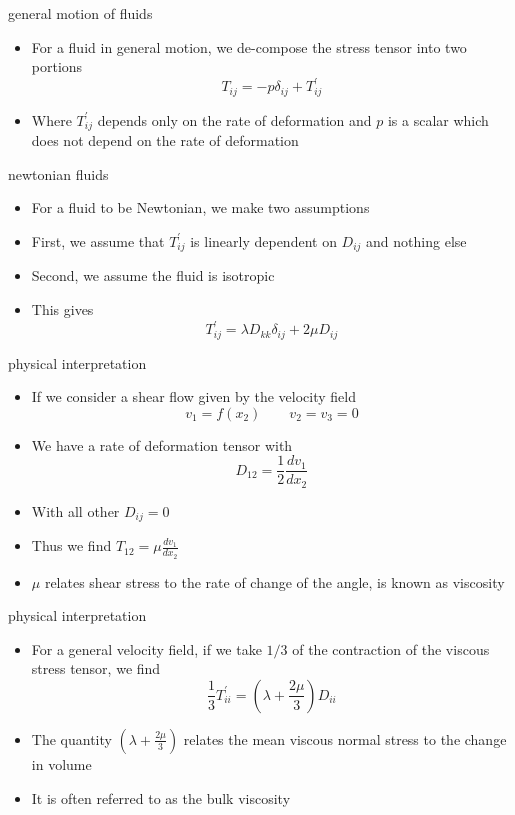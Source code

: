 \documentclass[12pt,handout]{beamer}
\providecommand{\tightlist}{%
  \setlength{\itemsep}{0pt}\setlength{\parskip}{0pt}}
\providecommand{\tightlist}{%
\setlength{\itemsep}{0pt}\setlength{\parskip}{0pt}}
\begin{document}
\begin{frame}{general motion of fluids}
\protect\hypertarget{general-motion-of-fluids}{}
\begin{itemize}
\item
  For a fluid in general motion, we de-compose the stress tensor into
  two portions \[T_{ij} = -p \delta_{ij} + T_{ij}^\prime\]
\item
  Where \(T_{ij}^\prime\) depends only on the rate of deformation and
  \(p\) is a scalar which does not depend on the rate of deformation
\end{itemize}
\end{frame}

\begin{frame}{newtonian fluids}
\protect\hypertarget{newtonian-fluids}{}
\begin{itemize}
\tightlist
\item
  For a fluid to be Newtonian, we make two assumptions
\item
  First, we assume that \(T_{ij}^\prime\) is linearly dependent on
  \(D_{ij}\) and nothing else
\item
  Second, we assume the fluid is isotropic
\item
  This gives \[T_{ij}^\prime = \lambda D_{kk}\delta_{ij} + 2\mu D_{ij}\]
\end{itemize}
\end{frame}

\begin{frame}{physical interpretation}
\protect\hypertarget{physical-interpretation}{}
\begin{itemize}
\item
  If we consider a shear flow given by the velocity field
  \[v_1 = f(x_2) \qquad v_2 = v_3 = 0\]
\item
  We have a rate of deformation tensor with
  \[D_{12} = \frac{1}{2} \frac{d v_1}{d x_2}\]
\item
  With all other \(D_{ij} = 0\)
\item
  Thus we find \(T_{12} = \mu \frac{dv_1}{dx_2}\)
\item
  \(\mu\) relates shear stress to the rate of change of the angle, is
  known as viscosity
\end{itemize}
\end{frame}

\begin{frame}{physical interpretation}
\protect\hypertarget{physical-interpretation-1}{}
\begin{itemize}
\item
  For a general velocity field, if we take \(1/3\) of the contraction of
  the viscous stress tensor, we find
  \[\frac{1}{3} T_{ii}^\prime = \left(\lambda + \frac{2\mu}{3}\right) D_{ii}\]
\item
  The quantity \(\left(\lambda + \frac{2\mu}{3}\right)\) relates the
  mean viscous normal stress to the change in volume
\item
  It is often referred to as the bulk viscosity
\end{itemize}
\end{frame}
\end{document}
